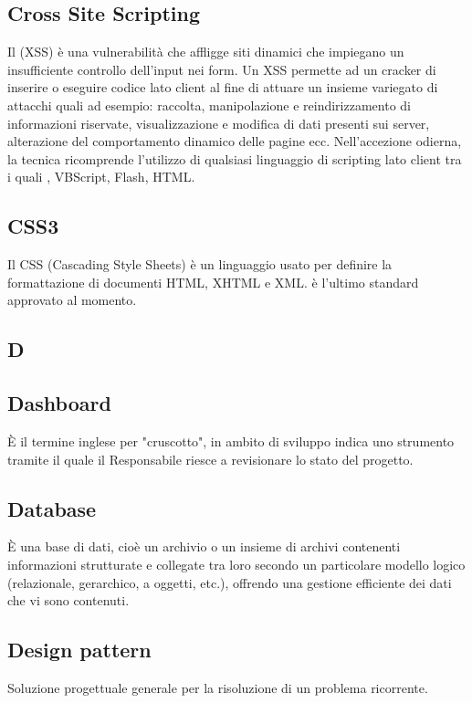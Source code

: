 \subsection*{Cross Site Scripting}
Il  (XSS) è una vulnerabilità che affligge siti  dinamici che impiegano un insufficiente controllo dell'input nei form. Un XSS permette ad un cracker di inserire o eseguire codice lato client al fine di attuare un insieme variegato di attacchi quali ad esempio: raccolta, manipolazione e reindirizzamento di informazioni riservate, visualizzazione e modifica di dati presenti sui server, alterazione del comportamento dinamico delle pagine  ecc. Nell'accezione odierna, la tecnica ricomprende l'utilizzo di qualsiasi linguaggio di scripting lato client tra i quali , VBScript, Flash, HTML.

\subsection*{CSS3}
Il CSS (Cascading Style Sheets) è un linguaggio usato per definire la formattazione di documenti HTML, XHTML e XML.
 è l'ultimo standard approvato al momento.

\newpage

\begin{center}
\Huge\section*{\uppercase{D}}
\end{center}

\subsection*{Dashboard}
È il termine inglese per "cruscotto", in ambito di sviluppo indica uno strumento
tramite il quale il Responsabile riesce a revisionare lo stato del progetto.

\subsection*{Database}
È una base di dati, cioè un archivio o un insieme di archivi contenenti informazioni
strutturate e collegate tra loro secondo un particolare modello logico (relazionale, gerarchico,
a oggetti, etc.), offrendo una gestione efficiente dei dati che vi sono contenuti.

\subsection*{Design pattern}
Soluzione progettuale generale per la risoluzione di un problema ricorrente.

